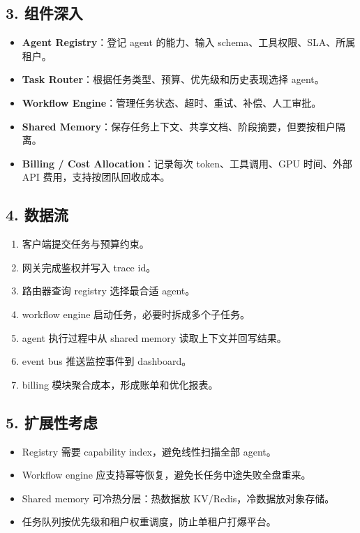 \subsection{3. 组件深入}
\begin{itemize}[leftmargin=2em]
\item \textbf{Agent Registry}：登记 agent 的能力、输入 schema、工具权限、SLA、所属租户。
\item \textbf{Task Router}：根据任务类型、预算、优先级和历史表现选择 agent。
\item \textbf{Workflow Engine}：管理任务状态、超时、重试、补偿、人工审批。
\item \textbf{Shared Memory}：保存任务上下文、共享文档、阶段摘要，但要按租户隔离。
\item \textbf{Billing / Cost Allocation}：记录每次 token、工具调用、GPU 时间、外部 API 费用，支持按团队回收成本。
\end{itemize}

\subsection{4. 数据流}
\begin{enumerate}[leftmargin=2em]
\item 客户端提交任务与预算约束。
\item 网关完成鉴权并写入 trace id。
\item 路由器查询 registry 选择最合适 agent。
\item workflow engine 启动任务，必要时拆成多个子任务。
\item agent 执行过程中从 shared memory 读取上下文并回写结果。
\item event bus 推送监控事件到 dashboard。
\item billing 模块聚合成本，形成账单和优化报表。
\end{enumerate}

\subsection{5. 扩展性考虑}
\begin{itemize}[leftmargin=2em]
\item Registry 需要 capability index，避免线性扫描全部 agent。
\item Workflow engine 应支持幂等恢复，避免长任务中途失败全盘重来。
\item Shared memory 可冷热分层：热数据放 KV/Redis，冷数据放对象存储。
\item 任务队列按优先级和租户权重调度，防止单租户打爆平台。
\end{itemize}

